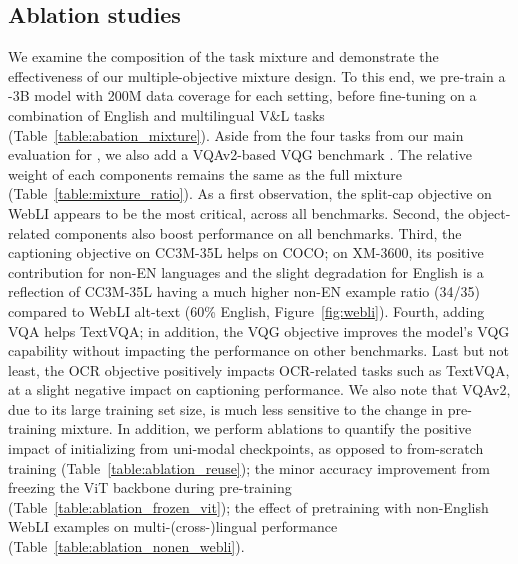 \documentclass{article}
\begin{document}
\subsection{Ablation studies}
\label{sec:ablations}
We examine the composition of the task mixture and demonstrate the effectiveness of our multiple-objective mixture design.
To this end, we pre-train a \NAME-3B model with 200M data coverage for each setting, before fine-tuning on a combination of English and multilingual V\&L tasks (Table~\ref{table:abation_mixture}).
Aside from the four tasks from our main evaluation for \NAME, we also add a VQAv2-based VQG benchmark \citep{akula2021crossvqa}.
The relative weight of each components remains the same as the full mixture (Table~\ref{table:mixture_ratio}).
As a first observation, the split-cap objective on WebLI appears to be the most critical, across all benchmarks.
Second, the object-related components also boost performance on all benchmarks. Third, the captioning objective on CC3M-35L helps on COCO; on XM-3600, its positive  contribution for non-EN languages and the slight degradation for English is a reflection of CC3M-35L having a much higher non-EN example ratio (34/35) compared to WebLI alt-text (60\% English, Figure~\ref{fig:webli}).
Fourth, adding VQA helps TextVQA; in addition, the VQG objective improves the model's VQG capability without impacting the performance on other benchmarks.
Last but not least, the OCR objective positively impacts OCR-related tasks such as TextVQA, at a slight negative impact on captioning performance.
We also note that VQAv2, due to its large training set size, is much less sensitive to the change in pre-training mixture. In addition, we perform ablations to quantify the positive impact of initializing from uni-modal checkpoints, as opposed to from-scratch training (Table~\ref{table:ablation_reuse}); the minor accuracy improvement from freezing the ViT backbone during pre-training (Table~\ref{table:ablation_frozen_vit}); the effect of pretraining with non-English WebLI examples on multi-(cross-)lingual performance (Table~\ref{table:ablation_nonen_webli}).
\end{document}
